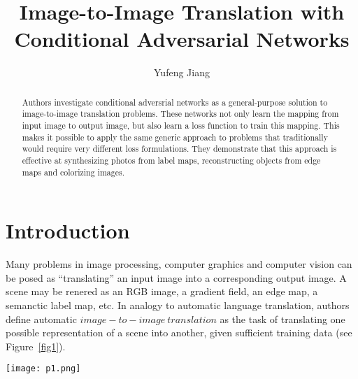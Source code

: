 \documentclass[10pt,twocolumn,letterpaper]{article}
\begin{document}
\title{Image-to-Image Translation with Conditional Adversarial Networks}
\author{Yufeng Jiang}
\maketitle

\begin{abstract}

Authors investigate conditional adversrial networks as a general-purpose solution to image-to-image translation problems. These networks not only learn the mapping from input image to output image, but also learn a loss function to train this mapping. This makes it possible to apply the same generic approach to problems that traditionally would require very different loss formulations. They demonstrate that this approach is effective at synthesizing photos from label maps, reconstructing objects from edge maps and colorizing images.

\end{abstract}

\section{Introduction}

Many problems in image processing, computer graphics and computer vision can be posed as ``translating'' an input image into a corresponding output image. A scene may be renered as an RGB image, a gradient field, an edge map, a semanctic label map, etc. In analogy to automatic language translation, authors define automatic $image-to-image~translation$ as the task of translating one possible representation of a scene into another, given sufficient training data (see Figure~\ref{fig1}).

\begin{figure*}
\begin{center}
\texttt{[image: p1.png]}
\end{center}
\caption{Many problems in image processing, graphics, and vision involve translating an input image into a corresponding output image. These problems are often treated with application-specific algorithms, even though the setting is always the same: map pixels to pixels. Conditional adversarial nets are a general-purpose solution that appears to work well on a wide variety of these problems. Here we show results of the method on several. In each case we use the same architecture and objective, and simply train on different data.}
\label{fig1}
\end{figure*}
\end{document}
